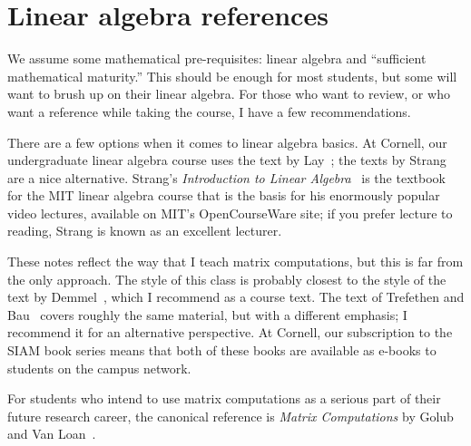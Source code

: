 \section{Linear algebra references}

We assume some mathematical pre-requisites: linear algebra
and ``sufficient mathematical maturity.''  This should be enough for
most students, but some will want to brush up on their linear algebra.
For those who want to review, or who want a reference while taking
the course, I have a few recommendations.

There are a few options when it comes to linear algebra basics.  At
Cornell, our undergraduate linear algebra course uses the text
by Lay~\cite{Lay:2016:Linear}; the texts by Strang~\cite{Strang:2006:Linear,Strang:2009:Introduction} are a nice
alternative.  Strang's {\em Introduction to Linear Algebra}~\cite{Strang:2009:Introduction} is the textbook for the MIT
linear algebra course that is the basis for his enormously popular
video lectures, available on MIT's OpenCourseWare site; if you prefer
lecture to reading, Strang is known as an excellent lecturer.

These notes reflect the way that I teach matrix computations, but this
is far from the only approach.  The style of this class is probably
closest to the style of the text by Demmel~\cite{Demmel:1997:Applied},
which I recommend as a course text.  The text of Trefethen and
Bau~\cite{Trefethen:1997:Numerical} covers roughly the same material,
but with a different emphasis; I recommend it for an alternative
perspective.  At Cornell, our subscription to the SIAM book series
means that both of these books are available as e-books to students
on the campus network.

For students who intend to use matrix computations as a serious part of
their future research career, the canonical reference is {\em Matrix
Computations} by Golub and Van Loan~\cite{Golub:2013:Matrix}.

